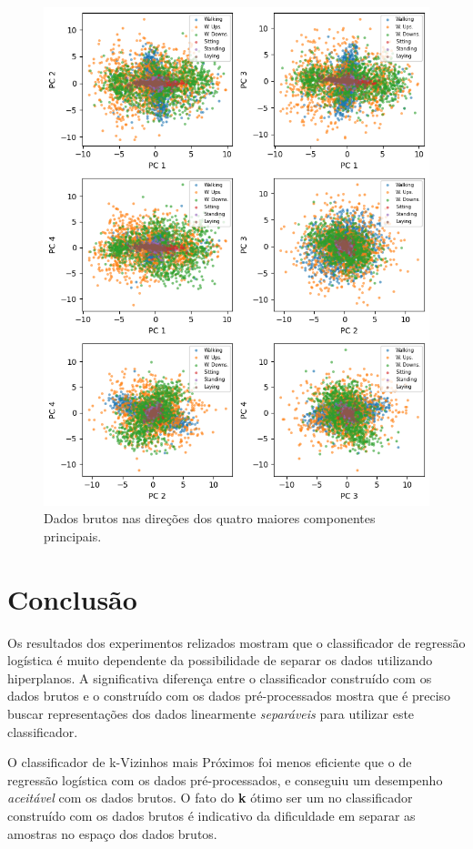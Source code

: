 \documentclass[final,5p]{elsarticle}
\numberwithin{equation}{section}
\begin{document}
        \begin{figure}[hbt!]
            \includegraphics[width=0.95\columnwidth]{C_PrincipalComponents_Raw.png}
            \caption{Dados brutos nas direções dos quatro maiores componentes principais.}
            \label{fig:pc_brutos}
        \end{figure}

\section{Conclusão}

        Os resultados dos experimentos relizados mostram que o classificador de regressão logística é muito dependente da possibilidade de separar os dados utilizando hiperplanos. A significativa diferença entre o classificador construído com os dados brutos e o construído com os dados pré-processados mostra que é preciso buscar representações dos dados linearmente \emph{separáveis} para utilizar este classificador.

        O classificador de k-Vizinhos mais Próximos foi menos eficiente que o de regressão logística com os dados pré-processados, e conseguiu um desempenho \emph{aceitável} com os dados brutos. O fato do \textbf{k} ótimo ser um no classificador construído com os dados brutos é indicativo da dificuldade em separar as amostras no espaço dos dados brutos.
\end{document}
